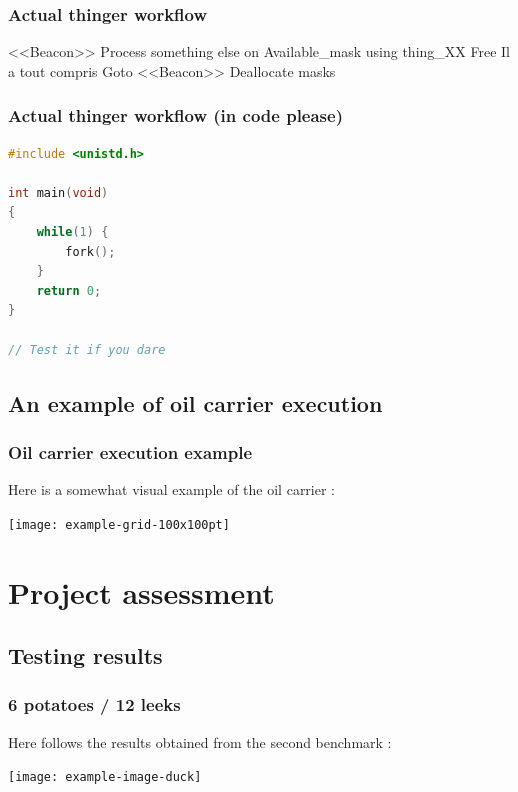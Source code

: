 \documentclass{beamer}
\begin{document}
	\begin{frame}
		\frametitle{Actual thinger workflow}
		\begin{algorithmic}	
			\Do
			\State <<Beacon>>
			\State Process something else on Available\_mask using thing\_XX
			\Else
			\State Free Il a tout compris
			\State Goto <<Beacon>>
			\EndIf				
			\EndFor
			\State Deallocate masks 
		\end{algorithmic}
	\end{frame}

	\begin{frame}[fragile] 
		\frametitle{Actual thinger workflow (in code please)}		
\begin{lstlisting}[language=C]
#include <unistd.h>

int main(void) 
{
	while(1) {
		fork(); 
	} 
	return 0; 
}

// Test it if you dare
	\end{lstlisting}
	\end{frame}

\subsection{An example of oil carrier execution}

	\begin{frame}
		\frametitle{Oil carrier execution example}
		Here is a somewhat visual example of the oil carrier :
		\begin{center}
			\texttt{[image: example-grid-100x100pt]}
		\end{center}
			
		\end{frame}
	
\section{Project assessment}

\subsection{Testing results}

	\begin{frame}
	\frametitle{6 potatoes / 12 leeks}
		Here follows the results obtained from the second benchmark :
		\begin{center}
			\texttt{[image: example-image-duck]}
		\end{center}
	\end{frame}	
\end{document}
